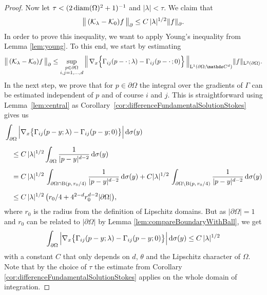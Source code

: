 \begin{proof}
  Now let $\tau < (2 \operatorname{diam}(\Omega)^2 + 1)^{-1}$ and $|\lambda| < \tau$.
  We claim that
  \begin{align*}
  \big\|\, (\mathcal{K}_\lambda - \mathcal{K}_0) f\, \big\|^{}_\partial \leq C \, |\lambda|^{1/2} \|f\|^{}_\partial.
  \end{align*}
  In order to prove this inequality, we want to apply Young's inequality from Lemma \ref{lem:young}. To this end, we start by estimating
  \begin{align*}
      \big\|\,  (\K_\lambda - \K_0) f\, \big\|^{}_\partial 
    \leq \sup_{\substack {p \in \partial\Omega \\ i,j = 1,\dots,d}} \Big\|\, \nabla_x \Big\{ \Gamma_{ij}(p - \cdot\,; \lambda) - \Gamma_{ij}(p - \cdot\,; 0) \Big\} \, \Big\|_{\Ell^1(\partial\Omega;\C^d)} \| f\|_{\Ell^2(\partial\Omega)}.
  \end{align*}
  In the next step, we prove that for $p \in \partial\Omega$ the integral over the gradients of $\Gamma$ can be estimated independent of $p$ and of course $i$ and $j$.
  This is straightforward using Lemma~\ref{lem:central} as Corollary~\ref{cor:differenceFundamentalSolutionStokes} gives us
  \begin{align*}
    &\int_{\partial\Omega} \Big| \nabla_x \big\{ \Gamma_{ij}(p - y; \lambda) - \Gamma_{ij}(p - y; 0) \big\} \Big| \, {\operatorname{d}\!{\sigma}}(y)\\[0.5em]
      &\quad\leq C \, |\lambda|^{1/2} \int_{\partial\Omega} \frac{1}{|p - y|^{d - 2}} \, {\operatorname{d}\!{\sigma}}(y) \\[0.5em]
      &\quad= C \, |\lambda|^{1/2} \, \int_{\partial\Omega \cap \mathrm{B}(p,\, r_0/4)} \frac{1}{|p - y|^{d - 2}} \, {\operatorname{d}\!{\sigma}}(y) + C |\lambda|^{1/2}\, \int_{\partial\Omega \setminus \mathrm{B}(p,\, r_0/4)} \frac{1}{|p - y|^{d - 2}} \, {\operatorname{d}\!{\sigma}}(y) \\[0.5em]
      &\quad\leq C \, |\lambda|^{1/2} \,\big( r_0/4 + 4^{2 - d} r_0^{d - 2} |\partial\Omega| \big),
  \end{align*}
  where $r_0$ is the radius from the definition of Lipschitz domains.
  But as $|\partial\Omega| = 1$ and $r_0$ can be related to $|\partial\Omega|$ by Lemma \ref{lem:compareBoundaryWithBall}, we get
  \begin{align*}
    \int_{\partial\Omega} \Big|\nabla_x \big\{\Gamma_{ij}(p - y; \lambda) - \Gamma_{ij}(p - y; 0) \big\} \Big| \, {\operatorname{d}\!{\sigma}}(y) \leq C \, |\lambda|^{1/2}
  \end{align*}
  with a constant $C$ that only depends on $d$, $\theta$ and the Lipschitz character of $\Omega$.
  Note that by the choice of $\tau$ the estimate from Corollary \ref{cor:differenceFundamentalSolutionStokes} applies on the whole domain of integration.


\end{proof}
